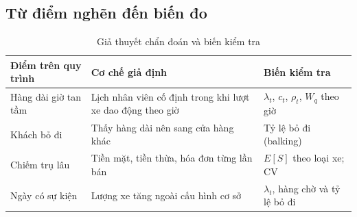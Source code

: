 \subsection{Từ điểm nghẽn đến biến đo}
\begin{table}[htbp]\centering\small
\caption{Giả thuyết chẩn đoán và biến kiểm tra}\label{r1:diagnosis}
\begin{tabularx}{\linewidth}{@{}Y Y Y@{}}
\toprule
Điểm trên quy trình & Cơ chế giả định & Biến kiểm tra \\
\midrule
Hàng dài giờ tan tầm & Lịch nhân viên cố định trong khi lượt xe dao động theo giờ & $\lambda_t$, $c_t$, $\rho_t$, $W_q$ theo giờ \\
Khách bỏ đi & Thấy hàng dài nên sang cửa hàng khác & Tỷ lệ bỏ đi (balking) \\
Chiếm trụ lâu & Tiền mặt, tiền thừa, hóa đơn từng lần bán & $E[S]$ theo loại xe; CV \\
Ngày có sự kiện & Lượng xe tăng ngoài cấu hình cơ sở & $\lambda_t$, hàng chờ và tỷ lệ bỏ đi \\
\bottomrule
\end{tabularx}
\end{table}


